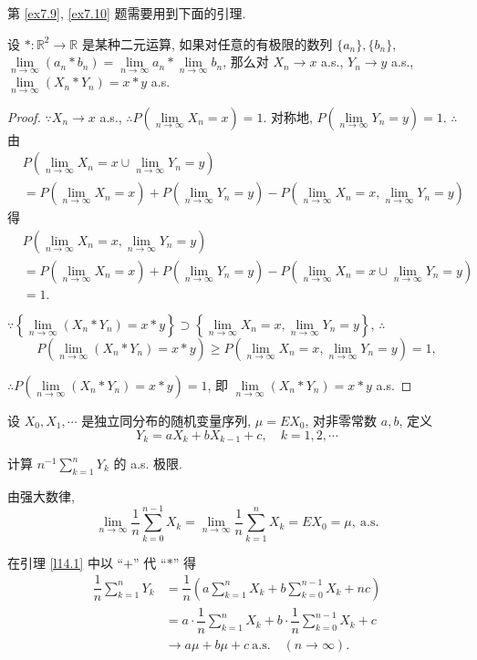 \documentclass[color=black,device=normal,lang=cn]{elegantnote}
\numberwithin{equation}{section}
\theoremstyle{plain}
\numberwithin{exercise}{exsection}
\begin{document}
第 \ref{ex7.9}, \ref{ex7.10} 题需要用到下面的引理.
\begin{lemma}\label{l14.1}
    设 $*:\mathbb{R}^2\to\mathbb{R}$ 是某种二元运算, 如果对任意的有极限的数列 $\{a_n\},\{b_n\}$, $\lim\limits_{n\to\infty}(a_n*b_n)=\lim\limits_{n\to\infty}a_n*\lim\limits_{n\to\infty}b_n$, 那么对 $X_n\to x$ a.s., $Y_n\to y$ a.s., $\lim\limits_{n\to\infty}(X_n*Y_n)=x*y$ a.s.
\end{lemma}
\begin{proof}
    $\because X_n\to x$ a.s., $\therefore P\left(\lim\limits_{n\to\infty}X_n=x\right)=1$. 对称地, $P\left(\lim\limits_{n\to\infty}Y_n=y\right)=1$. $\therefore$ 由
    \begin{align*}
        & P\left(\lim\limits_{n\to\infty}X_n=x\cup\lim\limits_{n\to\infty}Y_n=y\right) \\
        & =P\left(\lim\limits_{n\to\infty}X_n=x\right)+P\left(\lim\limits_{n\to\infty}Y_n=y\right)-P\left(\lim\limits_{n\to\infty}X_n=x,\lim\limits_{n\to\infty}Y_n=y\right)
    \end{align*}
    得
    \begin{align*}
        & P\left(\lim\limits_{n\to\infty}X_n=x,\lim\limits_{n\to\infty}Y_n=y\right) \\
        & =P\left(\lim\limits_{n\to\infty}X_n=x\right)+P\left(\lim\limits_{n\to\infty}Y_n=y\right)-P\left(\lim\limits_{n\to\infty}X_n=x\cup\lim\limits_{n\to\infty}Y_n=y\right) \\
        & =1.
    \end{align*}

    $\because\left\{\lim\limits_{n\to\infty}\left(X_n*Y_n\right)=x*y\right\}\supset\left\{\lim\limits_{n\to\infty}X_n=x,\lim\limits_{n\to\infty}Y_n=y\right\}$, $\therefore$
    \[P\left(\lim\limits_{n\to\infty}\left(X_n*Y_n\right)=x*y\right)\geq P\left(\lim\limits_{n\to\infty}X_n=x,\lim\limits_{n\to\infty}Y_n=y\right)=1,\]

    $\therefore P\left(\lim\limits_{n\to\infty}\left(X_n*Y_n\right)=x*y\right)=1$, 即 $\lim\limits_{n\to\infty}(X_n*Y_n)=x*y$ a.s.
\end{proof}
\begin{exercise}[有修改]\label{ex7.9}
    设 $X_0,X_1,\cdots$ 是独立同分布的随机变量序列, $\mu=EX_0$, 对非零常数 $a,b$, 定义
    \[Y_k=aX_k+bX_{k-1}+c,\quad k=1,2,\cdots\]

    计算 $n^{-1}\sum\limits_{k=1}^nY_k$ 的 a.s. 极限.
\end{exercise}
\begin{solution}
    由强大数律,
    \[\lim\limits_{n\to\infty}\dfrac{1}{n}\sum\limits_{k=0}^{n-1}X_k=\lim\limits_{n\to\infty}\dfrac{1}{n}\sum\limits_{k=1}^nX_k=EX_0=\mu,\ \text{a.s.}\]

    在引理 \ref{l14.1} 中以 ``$+$'' 代 ``$*$'' 得
    \begin{align*}
        \dfrac{1}{n}\sum\limits_{k=1}^nY_k & =\dfrac{1}{n}\left(a\sum\limits_{k=1}^nX_k+b\sum\limits_{k=0}^{n-1}X_k+nc\right) \\
        & =a\cdot\dfrac{1}{n}\sum\limits_{k=1}^nX_k+b\cdot\dfrac{1}{n}\sum\limits_{k=0}^{n-1}X_k+c \\
        & \to a\mu+b\mu+c\ \text{a.s.}\quad(n\to\infty).
    \end{align*}
\end{solution}
\end{document}

